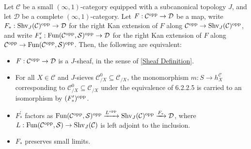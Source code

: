 \documentclass[10pt]{article}
\newcommand{\mS}{\mathcal S}
\newcommand{\C}{\mathcal C}
\newcommand{\cD}{\mathcal{D}}
\theoremstyle{witharg}
\theoremstyle{witharg}
\theoremstyle{witharg2}
\begin{document}
\begin{lemma}{}\label{Kan extensions of Sheaves}

    Let $\C$ be a small $(\infty,1)$-category equipped with a subcanonical topology $J$, and let $\cD$ be a complete $(\infty,1)$-category. Let $F:\C^{\textnormal{opp}}\rightarrow \cD$ be a map, write $F_*:\textnormal{Shv}_J(\C)^{\textnormal{opp}}\rightarrow \cD$ for the right Kan extension of $F$ along $\C^{\textnormal{opp}}\rightarrow \textnormal{Shv}_J(\C)^{\textnormal{opp}}$, and write $F^\prime_*:\textnormal{Fun}(\C^{\textnormal{opp}},\mS)^{\textnormal{opp}}\rightarrow \cD$ for the right Kan extension of $F$ along $\C^{\textnormal{opp}}\rightarrow \textnormal{Fun}(\C^{\textnormal{opp}},\mS)^{\textnormal{opp}}$. Then, the following are equivalent:

    \begin{itemize}
    
        \item [$(1)$] $F:\C^{\textnormal{opp}}\rightarrow \cD$ is a $J$-sheaf, in the sense of \ref{Sheaf Definition}.

        \item [$(2)$] For all $X\in \C$ and $J$-sieves $\C^0_{/X}\subseteq \C_{/X}$, the monomorphism $m:S\rightarrow h^\C_X$ corresponding to $\C^0_{/X}\subseteq \C_{/X}$ under the equivalence of  6.2.2.5 is carried to an isomorphism by $(F_*^\prime)^{\textnormal{opp}}$.


        \item [$(3)$] $F^\prime_*$ factors as $\textnormal{Fun}(\C^{\textnormal{opp}},\mS)^{\textnormal{opp}}\xrightarrow{L^{\textnormal{opp}}}\textnormal{Shv}_J(\C)^{\textnormal{opp}}\xrightarrow{F_*}\cD$, where $L:\textnormal{Fun}(\C^{\textnormal{opp}},\mS)\rightarrow \textnormal{Shv}_J(\C)$ is left adjoint to the inclusion.

        
        \item [$(4)$] $F_*$ preserves small limits.

        
    \end{itemize}
    
\end{lemma}
\end{document}
